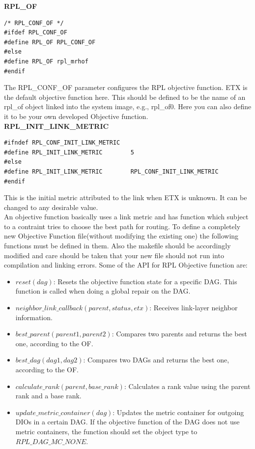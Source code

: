 \noindent\textbf{RPL\_OF}
\begin{verbatim}
/* RPL_CONF_OF */
#ifdef RPL_CONF_OF
#define RPL_OF RPL_CONF_OF
#else
#define RPL_OF rpl_mrhof
#endif
\end{verbatim}
The RPL\_CONF\_OF parameter configures the RPL objective function. ETX is the default objective function here. This should be defined to be the name of an rpl\_of object linked into the system image, e.g., rpl\_of0. Here you can also define it to be your own developed Objective function.\\

\noindent\textbf{RPL\_INIT\_LINK\_METRIC}
\begin{verbatim}
#ifndef RPL_CONF_INIT_LINK_METRIC
#define RPL_INIT_LINK_METRIC        5
#else
#define RPL_INIT_LINK_METRIC        RPL_CONF_INIT_LINK_METRIC
#endif
\end{verbatim}
This is the initial metric attributed to the link when ETX is unknown. It can be changed to any desirable value.\\

An objective function basically uses a link metric and has function which subject to a contraint tries to choose the best path for routing. To define a completely new Objective Function file(without modifying the existing one) the following functions must be defined in them. Also the makefile should be accordingly modified and care should be taken that your new file should not run into compilation and linking errors. \noindent Some of the API for RPL Objective function are:\\
\vspace{-1cm}
\begin{itemize}
\item $reset(dag)$: Resets the objective function state for a specific DAG. This function is called when doing a global repair on the DAG.
\item $neighbor\_link\_callback(parent, status, etx)$: Receives link-layer neighbor information.
\item $best\_parent(parent1, parent2)$: Compares two parents and returns the best one, according to the OF.
\item $best\_dag(dag1, dag2)$: Compares two DAGs and returns the best one, according to the OF.
\item $calculate\_rank(parent, base\_rank)$: Calculates a rank value using the parent rank and a base rank.
\item $update\_metric\_container(dag)$: Updates the metric container for outgoing DIOs in a certain DAG. If the objective function of the DAG does not use metric containers, the function should set the object type to $RPL\_DAG\_MC\_NONE.$
\end{itemize}

